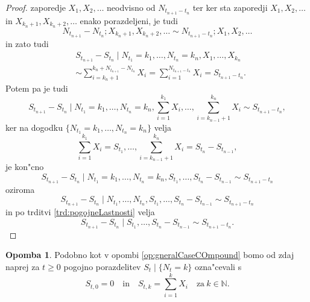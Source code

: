 \documentclass[12pt, a4paper, reqno]{amsart}
\theoremstyle{definition}
\newtheorem{opomba}[definicija]{Opomba}
\theoremstyle{plain}
\newcommand{\N}{\mathbb{N}}
\newcommand{\1}{\mathds{1}}
\newcommand*{\refPriloga}[1]{%
  \begingroup
    \hypersetup{
      linkcolor=properpurple,
      linkbordercolor=properpurple,
    }%
    \ref{#1}%
  \endgroup
}
\begin{document}
\begin{proof}
            zaporedje $X_1, X_2, \dots$ neodvisno od $N_{t_{n+1} - t_n}$ ter ker sta zaporedji 
            $X_1, X_2, \dots$ in $X_{k_n + 1}, X_{k_n + 2}, \dots$ enako porazdeljeni, je tudi 
            \begin{equation*}
                N_{t_{n+1}} - N_{t_n}; X_{k_n + 1}, X_{k_n + 2}, \dots \sim N_{t_{n+1} - t_n}; X_1, X_2, \dots
            \end{equation*}
            in zato tudi 
            \begin{align*}
                &S_{t_{n+1}} - S_{t_n} \mid N_{t_1} = k_1, \dots, N_{t_n} = k_n, X_1, \dots, X_{k_n} \\
                &\sim \sum_{i = k_n + 1}^{k_n + N_{t_{n+1}} - N_{t_n}}X_i 
                = \sum_{i = 1}^{N_{t_{n+1} - t_n}}X_i = S_{t_{n+1} - t_n}.
            \end{align*}
            Potem pa je tudi
            \begin{equation*}
                S_{t_{n+1}} - S_{t_n}\mid N_{t_1} = k_1, \dots, N_{t_n} = k_n, \sum_{i=1}^{k_1}X_i, \dots, \sum_{i=k_{n-1} + 1}^{k_n}X_i \sim S_{t_{n+1} - t_n}, 
            \end{equation*}
            ker na dogodku $\{N_{t_1} = k_1, \dots, N_{t_n} = k_n\}$ velja 
            \begin{equation*}
                \sum_{i=1}^{k_1}X_i = S_{t_1}, \dots, \sum_{i=k_{n-1} + 1}^{k_n}X_i = S_{t_n} - S_{t_{n-1}},
            \end{equation*}
            je kon"cno 
            \begin{equation*}
                S_{t_{n+1}} - S_{t_n}\mid N_{t_1} = k_1, \dots, N_{t_n} = k_n, S_{t_1}, \dots, S_{t_n} - S_{t_{n-1}} \sim S_{t_{n+1} - t_n}
            \end{equation*}
            oziroma 
            \begin{equation*}
                S_{t_{n+1}} - S_{t_n}\mid N_{t_1}, \dots, N_{t_n}, S_{t_1}, \dots, S_{t_n} - S_{t_{n-1}} \sim S_{t_{n+1} - t_n}
            \end{equation*}
            in po trditvi \refPriloga{trd:pogojneLastnosti} velja
            \begin{equation*}
                S_{t_{n+1}} - S_{t_n}\mid S_{t_1}, \dots, S_{t_n} - S_{t_{n-1}} \sim S_{t_{n+1} - t_n}.
            \end{equation*}
        \end{proof}

        \begin{opomba}
            Podobno kot v opombi \ref{op:gneralCaseCOmpound} bomo od zdaj naprej za $t\geq0$  
            pogojno porazdelitev $S_t \mid \{N_t = k\}$ ozna"cevali s
            \begin{equation*}
                S_{t, 0} = 0 \quad \text{in} \quad S_{t, k} = \sum_{i=1}^kX_i \quad \text{za} \ k\in\N.
            \end{equation*}
        \end{opomba}
\end{document}
